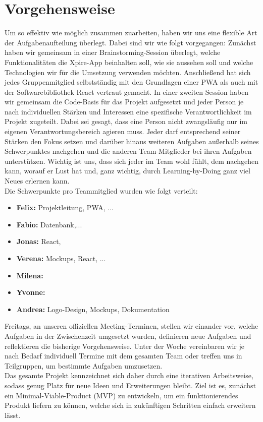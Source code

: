 \section{Vorgehensweise}
Um so effektiv wie möglich zusammen zuarbeiten, haben wir uns eine flexible Art der Aufgabenaufteilung überlegt. Dabei sind wir wie folgt vorgegangen: Zunächst haben wir gemeinsam in einer Brainstorming-Session überlegt, welche Funktionalitäten die Xpire-App beinhalten soll, wie sie aussehen soll und welche Technologien wir für die Umsetzung verwenden möchten. Anschließend hat sich jedes Gruppenmitglied selbstständig mit den Grundlagen einer PWA als auch mit der Softwarebibliothek React vertraut gemacht. In einer zweiten Session haben wir gemeinsam die Code-Basis für das Projekt aufgesetzt und jeder Person je nach individuellen Stärken und Interessen eine spezifische Verantwortlichkeit im Projekt zugeteilt. Dabei sei gesagt, dass eine Person nicht zwangsläufig nur im eigenen Verantwortungsbereich agieren muss. Jeder darf entsprechend seiner Stärken den Fokus setzen und darüber hinaus weiteren Aufgaben außerhalb seines Schwerpunktes nachgehen und die anderen Team-Mitglieder bei ihren Aufgaben unterstützen. Wichtig ist uns, dass sich jeder im Team wohl fühlt, dem nachgehen kann, worauf er Lust hat und, ganz wichtig, durch Learning-by-Doing ganz viel Neues erlernen kann.\\
Die Schwerpunkte pro Teammitglied wurden wie folgt verteilt:
\begin{itemize}[noitemsep]
	\item \textbf{Felix:} Projektleitung, PWA, ...
	\item \textbf{Fabio:} Datenbank,...
	\item \textbf{Jonas:} React, 
	\item \textbf{Verena:} Mockups, React, ...
	\item \textbf{Milena:} 
	\item \textbf{Yvonne:}
	\item \textbf{Andrea:} Logo-Design, Mockups, Dokumentation
\end{itemize}
Freitags, an unseren offiziellen Meeting-Terminen, stellen wir einander vor, welche Aufgaben in der Zwischenzeit umgesetzt wurden, definieren neue Aufgaben und reflektieren die bisherige Vorgehensweise. Unter der Woche vereinbaren wir je nach Bedarf individuell Termine mit dem gesamten Team oder treffen uns in Teilgruppen, um bestimmte Aufgaben umzusetzen.\\
Das gesamte Projekt kennzeichnet sich daher durch eine iterativen Arbeitsweise, sodass genug Platz für neue Ideen und Erweiterungen bleibt. Ziel ist es, zunächst ein Minimal-Viable-Product (MVP) zu entwickeln, um ein funktionierendes Produkt liefern zu können, welche sich in zukünftigen Schritten einfach erweitern lässt.


